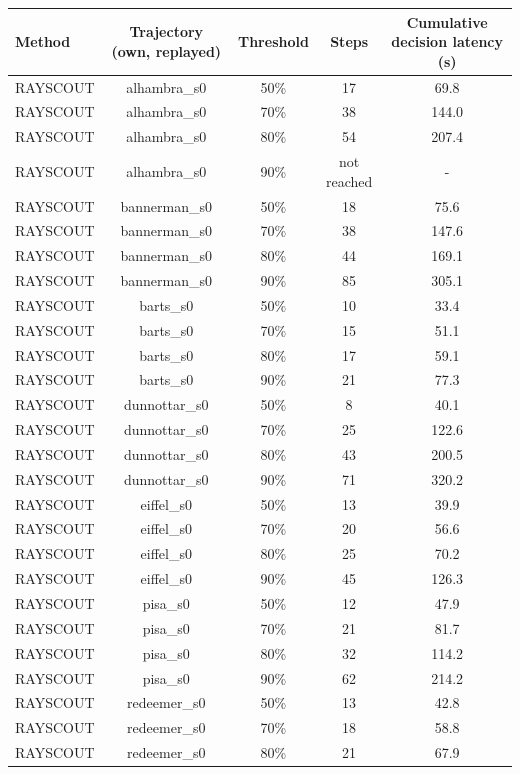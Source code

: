 \begin{tabular}{@{}lcccc@{}}
\toprule
Method & Trajectory (own, replayed) & Threshold & Steps & Cumulative decision latency (s) \\
\midrule
RAYSCOUT & alhambra\_s0 & 50\% & 17 & 69.8 \\
RAYSCOUT & alhambra\_s0 & 70\% & 38 & 144.0 \\
RAYSCOUT & alhambra\_s0 & 80\% & 54 & 207.4 \\
RAYSCOUT & alhambra\_s0 & 90\% & not reached & - \\
RAYSCOUT & bannerman\_s0 & 50\% & 18 & 75.6 \\
RAYSCOUT & bannerman\_s0 & 70\% & 38 & 147.6 \\
RAYSCOUT & bannerman\_s0 & 80\% & 44 & 169.1 \\
RAYSCOUT & bannerman\_s0 & 90\% & 85 & 305.1 \\
RAYSCOUT & barts\_s0 & 50\% & 10 & 33.4 \\
RAYSCOUT & barts\_s0 & 70\% & 15 & 51.1 \\
RAYSCOUT & barts\_s0 & 80\% & 17 & 59.1 \\
RAYSCOUT & barts\_s0 & 90\% & 21 & 77.3 \\
RAYSCOUT & dunnottar\_s0 & 50\% & 8 & 40.1 \\
RAYSCOUT & dunnottar\_s0 & 70\% & 25 & 122.6 \\
RAYSCOUT & dunnottar\_s0 & 80\% & 43 & 200.5 \\
RAYSCOUT & dunnottar\_s0 & 90\% & 71 & 320.2 \\
RAYSCOUT & eiffel\_s0 & 50\% & 13 & 39.9 \\
RAYSCOUT & eiffel\_s0 & 70\% & 20 & 56.6 \\
RAYSCOUT & eiffel\_s0 & 80\% & 25 & 70.2 \\
RAYSCOUT & eiffel\_s0 & 90\% & 45 & 126.3 \\
RAYSCOUT & pisa\_s0 & 50\% & 12 & 47.9 \\
RAYSCOUT & pisa\_s0 & 70\% & 21 & 81.7 \\
RAYSCOUT & pisa\_s0 & 80\% & 32 & 114.2 \\
RAYSCOUT & pisa\_s0 & 90\% & 62 & 214.2 \\
RAYSCOUT & redeemer\_s0 & 50\% & 13 & 42.8 \\
RAYSCOUT & redeemer\_s0 & 70\% & 18 & 58.8 \\
RAYSCOUT & redeemer\_s0 & 80\% & 21 & 67.9 \\

\end{tabular}
